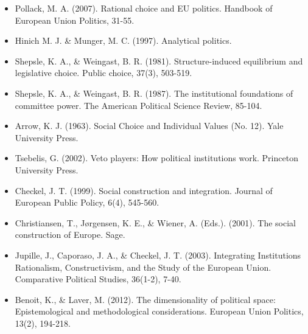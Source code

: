 \begin{itemize}
	\item Pollack, M. A. (2007). Rational choice and EU politics. Handbook of European Union Politics, 31-55.
	\item Hinich M. J. \& Munger, M. C. (1997). Analytical politics.
	\item Shepsle, K. A., \& Weingast, B. R. (1981). Structure-induced equilibrium and legislative choice. Public choice, 37(3), 503-519.
	\item Shepsle, K. A., \& Weingast, B. R. (1987). The institutional foundations of committee power. The American Political Science Review, 85-104.
	\item Arrow, K. J. (1963). Social Choice and Individual Values (No. 12). Yale University Press.
	\item Tsebelis, G. (2002). Veto players: How political institutions work. Princeton University Press.
	\item Checkel, J. T. (1999). Social construction and integration. Journal of European Public Policy, 6(4), 545-560.
	\item Christiansen, T., J{\o}rgensen, K. E., \& Wiener, A. (Eds.). (2001). The social construction of Europe. Sage.
	\item Jupille, J., Caporaso, J. A., \& Checkel, J. T. (2003). Integrating Institutions Rationalism, Constructivism, and the Study of the European Union. Comparative Political Studies, 36(1-2), 7-40.
	\item Benoit, K., \& Laver, M. (2012). The dimensionality of political space: Epistemological and methodological considerations. European Union Politics, 13(2), 194-218.
\end{itemize}





